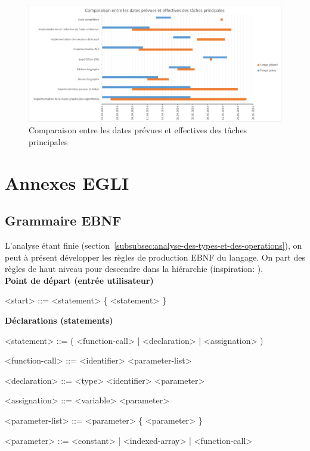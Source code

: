 \documentclass[french]{article}
\begin{document}
			\begin{figure}[H]
				\includegraphics[width=\textwidth]{Planification/comparaisondates.pdf}
				\caption{Comparaison entre les dates prévues et effectives des tâches principales}
				\label{fig:comparaisondates}
			\end{figure}
	
	\section{Annexes EGLI}
	\label{sec:annexes-egli}
	
		\subsection{Grammaire EBNF} 
		L'analyse étant finie (section~\ref{subsubsec:analyse-des-types-et-des-operations}), on peut à présent développer les règles de production EBNF du langage. On part des règles de haut niveau pour descendre dans la hiérarchie (inspiration: \cite{vutbr.cz}).\\
		
		\textbf{Point de départ (entrée utilisateur)}
		\begin{grammar}
			<start> ::= <statement> \{ <statement> \}
		\end{grammar}
		
		\textbf{Déclarations (statements)}
		\begin{grammar}
			<statement> ::= ( <function-call> | <declaration> | <assignation> ) \lit{;}
			
			<function-call> ::= <identifier> <parameter-list>
			
			<declaration> ::= <type> <identifier> \lit{=} <parameter>
			
			<assignation> ::= <variable> \lit{=} <parameter>
			
			<parameter-list> ::= \lit{(} <parameter> \{ \lit{,} <parameter> \} \lit{)}
			
			<parameter> ::= <constant> | <indexed-array> | <function-call>
		\end{grammar}
		
\end{document}
